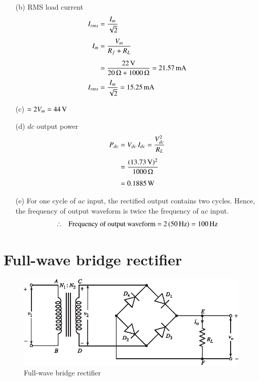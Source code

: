 \begin{solution}
\begin{itemize}
\item[(b)] RMS load current
\begin{align*}
I_{rms} & = \frac{I_m}{\sqrt{2}}\\[4pt]
I_m & = \frac{V_m}{R_f + R_L}\\[4pt]
&= \frac{22\operatorname{\mathrm{V}}}{20\,\Omega + 1000\,\Omega}= 21.57 \operatorname{mA}\\[3pt]
I_{rms} & = \frac{I_m}{\sqrt{2}} = 15.25 \operatorname{mA}
\end{align*}

\eject

\item[(c)] \hfill {}  $= 2 V_m = 44 \operatorname{\mathrm{V}}$\hfill\,

\item[(d)] $dc$ output power
\begin{align*}
P_{dc} & = V_{dc}\, I_{dc} = \frac{V^2_{dc}}{R_L}\\[4pt]
& = \frac{(13.73 \operatorname{\mathrm{V}})^2}{1000\,\Omega}\\[4pt]
& = 0.1885 \operatorname{W}
\end{align*}

\item[(e)] For one cycle of $ac$ input, the rectified output contains
  two cycles. Hence, the frequency of output waveform is twice the
  frequency of $ac$ input.
$$
\therefore ~~ \text{ Frequency of output waveform = $2\,(50\,\text{Hz})= 100 \operatorname{Hz}$}
$$
\end{itemize}
\vskip -1cm
\end{solution}

\section{Full-wave bridge rectifier}\label{sec2.16}
\begin{figure}[H]
\centering
\includegraphics{chap2/add-fig/S3-EE-02-008.eps}
\caption{Full-wave bridge rectifier}\label{fig2.8}
\end{figure}

